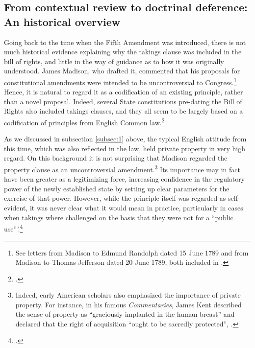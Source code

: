 \subsection{From contextual review to doctrinal deference: An historical overview}

Going back to the time when the Fifth Amendment was introduced, there is not much historical evidence explaining why the takings clause was included in the bill of rights, and little in the way of guidance as to how it was originally understood. James Madison, who drafted it, commented that his proposals for constitutional amendments were intended to be uncontroversial to Congress.\footnote{See letters from Madison to Edmund Randolph dated 15 June 1789 and from Madison to Thomas Jefferson dated 20 June 1789, both included in \cite{madison79}.}  Hence, it is natural to regard it as a codification of an existing principle, rather than a novel proposal. Indeed, several State constitutions pre-dating the Bill of Rights also included takings clauses, and they all seem to be largely based on a codification of principles from English Common law.\footcite[See][299]{johnson11}

As we discussed in subsection \ref{subsec:1} above, the typical English attitude from this time, which was also reflected in the law, held private property in very high regard. On this background it is not surprising that Madison regarded the property clause as an uncontroversial amendment.\footnote{Indeed, early American scholars also emphasized the importance of private property. For instance, in his famous {\it Commentaries}, James Kent described the sense of property as ``graciously implanted in the human breast'' and declared that the right of acquisition ``ought to be sacredly protected'', \cite[see][257]{kent27}.} Its importance may in fact have been greater as a legitimizing force, increasing confidence in the regulatory power of the newly established state by setting up clear parameters for the exercise of that power.  However, while the principle itself was regarded as self-evident, it was never clear what it would mean in practice, particularly in cases when takings where challenged on the basis that they were not for a ``public use'''.\footcite[See][317]{johnson11} 

